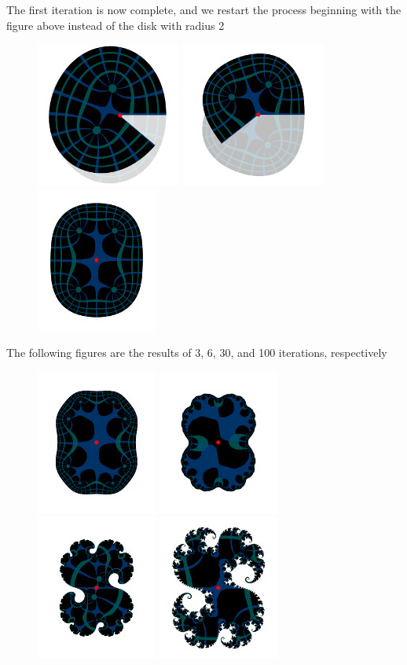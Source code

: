 \documentclass[12pt]{article}
\begin{document}
The first iteration is now complete, and we restart the process beginning with the figure above instead of the disk with radius 2
\begin{figure}[H]
	\centering
	\includegraphics[width=.2\textwidth]{images/julia6}\hfill
	\includegraphics[width=.2\textwidth]{images/julia7}\hfill
	\includegraphics[width=.2\textwidth]{images/julia8}
	\label{fig:figure3}
\end{figure}
The following figures are the results of 3, 6, 30, and 100 iterations, respectively
\begin{figure}[H]
	\centering
	\includegraphics[width=.2\textwidth]{images/julia9}\hfill
	\includegraphics[width=.2\textwidth]{images/julia10}\hfill
	\includegraphics[width=.2\textwidth]{images/julia11}\hfill
	\includegraphics[width=.2\textwidth]{images/julia12}
	\label{fig:figure3}
\end{figure}
\end{document}
